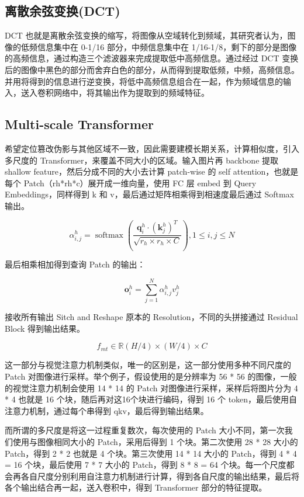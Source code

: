 \subsection{离散余弦变换(DCT)}

DCT 也就是离散余弦变换的缩写，将图像从空域转化到频域，其研究者认为，图像的低频信息集中在 0-1/16 部分，中频信息集中在 1/16-1/8，剩下的部分是图像的高频信息，通过构造三个滤波器来完成提取低中高频信息。通过经过 DCT 变换后的图像中黑色的部分而舍弃白色的部分，从而得到提取低频，中频，高频信息。并用将得到的信息进行逆变换，将低中高频信息组合在一起，作为频域信息的输入，送入卷积网络中，将其输出作为提取到的频域特征。

\subsection{Multi-scale Transformer}

希望定位篡改伪影与其他区域不一致，因此需要建模长期关系，计算相似度，引入多尺度的 Transformer，来覆盖不同大小的区域。输入图片再 backbone 提取 shallow feature，然后分成不同的大小去计算 patch-wise 的 self attention，也就是每个 Patch（rh*rh*c）展开成一维向量，使用 FC 层 embed 到 Query Embeddings，同样得到 k 和 v，最后通过矩阵相乘得到相速度最后通过 Softmax 输出。

$$
\alpha_{i, j}^{h}=\operatorname{softmax}\left(\frac{\boldsymbol{q}_{i}^{h} \cdot\left(\boldsymbol{k}_{j}^{h}\right)^{T}}{\sqrt{r_{h} \times r_{h} \times C}}\right), 1 \leq i, j \leq N
$$

最后相乘相加得到查询 Patch 的输出：

$$
\boldsymbol{o}_{i}^{h}=\sum_{j=1}^{N} \alpha_{i, j}^{h} v_{j}^{h}
$$

接收所有输出 Sitch and Reshape 原本的 Resolution，不同的头拼接通过 Residual Block 得到输出结果。

$$
f_{m t} \in \mathbb{R}(H / 4) \times(W / 4) \times C
$$

这一部分与视觉注意力机制类似，唯一的区别是，这一部分使用多种不同尺度的 Patch 对图像进行采样。举个例子，假设使用的是分辨率为 56 * 56 的图像，一般的视觉注意力机制会使用 14 * 14 的 Patch 对图像进行采样，采样后将图片分为 4 * 4 也就是 16 个块，随后再对这16个块进行编码，得到 16 个 token，最后使用自注意力机制，通过每个串得到 qkv，最后得到输出结果。

而所谓的多尺度是将这一过程重复数次，每次使用的 Patch 大小不同，第一次我们使用与图像相同大小的 Patch，采用后得到 1 个块。第二次使用 28 * 28 大小的 Patch，得到 2 * 2 也就是 4 个块。第三次使用 14 * 14 大小的 Patch，得到 4 * 4 = 16 个块，最后使用 7 * 7 大小的 Patch，得到 8 * 8 = 64 个块。每一个尺度都会再各自尺度分别利用自注意力机制进行计算，得到各自尺度的输出结果，最后将各个输出结合再一起，送入卷积中，得到 Transformer 部分的特征提取。


